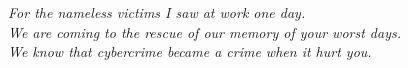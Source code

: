 \newpage
\thispagestyle{empty}   %
\vspace*{\fill}         %
\begin{center}
  \itshape              %
  For the nameless victims I saw at work one day.\\We are coming to the rescue of our memory of your worst days.\\We know that \gls{cybercrime} became a crime when it hurt you.
\end{center}
\vspace{\fill}
\newpage